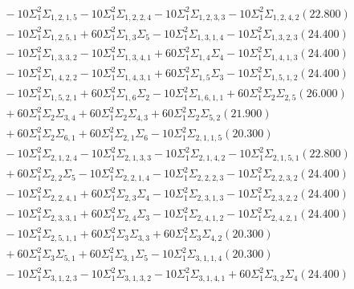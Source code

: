 \documentclass[12pt]{article}
\begin{document}
\begin{landscape}
\begin{align*}
		&\quad\quad -10\Sigma_{1}^{2}\Sigma_{1,2,1,5}-10\Sigma_{1}^{2}\Sigma_{1,2,2,4}-10\Sigma_{1}^{2}\Sigma_{1,2,3,3}-10\Sigma_{1}^{2}\Sigma_{1,2,4,2}(22.800) \\ 
		&\quad\quad -10\Sigma_{1}^{2}\Sigma_{1,2,5,1}+60\Sigma_{1}^{2}\Sigma_{1,3}\Sigma_{5}-10\Sigma_{1}^{2}\Sigma_{1,3,1,4}-10\Sigma_{1}^{2}\Sigma_{1,3,2,3}(24.400) \\ 
		&\quad\quad -10\Sigma_{1}^{2}\Sigma_{1,3,3,2}-10\Sigma_{1}^{2}\Sigma_{1,3,4,1}+60\Sigma_{1}^{2}\Sigma_{1,4}\Sigma_{4}-10\Sigma_{1}^{2}\Sigma_{1,4,1,3}(24.400) \\ 
		&\quad\quad -10\Sigma_{1}^{2}\Sigma_{1,4,2,2}-10\Sigma_{1}^{2}\Sigma_{1,4,3,1}+60\Sigma_{1}^{2}\Sigma_{1,5}\Sigma_{3}-10\Sigma_{1}^{2}\Sigma_{1,5,1,2}(24.400) \\ 
		&\quad\quad -10\Sigma_{1}^{2}\Sigma_{1,5,2,1}+60\Sigma_{1}^{2}\Sigma_{1,6}\Sigma_{2}-10\Sigma_{1}^{2}\Sigma_{1,6,1,1}+60\Sigma_{1}^{2}\Sigma_{2}\Sigma_{2,5}(26.000) \\ 
		&\quad\quad +60\Sigma_{1}^{2}\Sigma_{2}\Sigma_{3,4}+60\Sigma_{1}^{2}\Sigma_{2}\Sigma_{4,3}+60\Sigma_{1}^{2}\Sigma_{2}\Sigma_{5,2}(21.900) \\ 
		&\quad\quad +60\Sigma_{1}^{2}\Sigma_{2}\Sigma_{6,1}+60\Sigma_{1}^{2}\Sigma_{2,1}\Sigma_{6}-10\Sigma_{1}^{2}\Sigma_{2,1,1,5}(20.300) \\ 
		&\quad\quad -10\Sigma_{1}^{2}\Sigma_{2,1,2,4}-10\Sigma_{1}^{2}\Sigma_{2,1,3,3}-10\Sigma_{1}^{2}\Sigma_{2,1,4,2}-10\Sigma_{1}^{2}\Sigma_{2,1,5,1}(22.800) \\ 
		&\quad\quad +60\Sigma_{1}^{2}\Sigma_{2,2}\Sigma_{5}-10\Sigma_{1}^{2}\Sigma_{2,2,1,4}-10\Sigma_{1}^{2}\Sigma_{2,2,2,3}-10\Sigma_{1}^{2}\Sigma_{2,2,3,2}(24.400) \\ 
		&\quad\quad -10\Sigma_{1}^{2}\Sigma_{2,2,4,1}+60\Sigma_{1}^{2}\Sigma_{2,3}\Sigma_{4}-10\Sigma_{1}^{2}\Sigma_{2,3,1,3}-10\Sigma_{1}^{2}\Sigma_{2,3,2,2}(24.400) \\ 
		&\quad\quad -10\Sigma_{1}^{2}\Sigma_{2,3,3,1}+60\Sigma_{1}^{2}\Sigma_{2,4}\Sigma_{3}-10\Sigma_{1}^{2}\Sigma_{2,4,1,2}-10\Sigma_{1}^{2}\Sigma_{2,4,2,1}(24.400) \\ 
		&\quad\quad -10\Sigma_{1}^{2}\Sigma_{2,5,1,1}+60\Sigma_{1}^{2}\Sigma_{3}\Sigma_{3,3}+60\Sigma_{1}^{2}\Sigma_{3}\Sigma_{4,2}(20.300) \\ 
		&\quad\quad +60\Sigma_{1}^{2}\Sigma_{3}\Sigma_{5,1}+60\Sigma_{1}^{2}\Sigma_{3,1}\Sigma_{5}-10\Sigma_{1}^{2}\Sigma_{3,1,1,4}(20.300) \\ 
		&\quad\quad -10\Sigma_{1}^{2}\Sigma_{3,1,2,3}-10\Sigma_{1}^{2}\Sigma_{3,1,3,2}-10\Sigma_{1}^{2}\Sigma_{3,1,4,1}+60\Sigma_{1}^{2}\Sigma_{3,2}\Sigma_{4}(24.400) \\ 

\end{align*}
\end{landscape}
\end{document}
